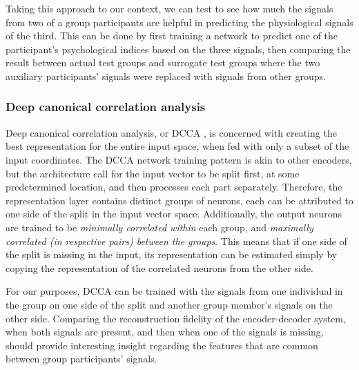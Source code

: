 \documentclass[a4paper, 11pt]{report}      %
\begin{document}
Taking this approach to our context, we can test to see how much the signals from two of a group participants are helpful in predicting the physiological signals of the third. This can be done by first training a network to predict one of the participant's psychological indices based on the three signals, then comparing the result between actual test groups and surrogate test groups where the two auxiliary participants' signals were replaced with signals from other groups.


\subsubsection{Deep canonical correlation analysis}
Deep canonical correlation analysis, or DCCA  \citep{andrew2013deep}, is concerned with creating the best representation for the entire input space, when fed with only a subset of the input coordinates. The DCCA network training pattern is akin to other encoders, but the architecture call for the input vector to be split first, at some predetermined location, and then processes each part separately. Therefore, the representation layer contains distinct groups of neurons, each can be attributed to one side of the split in the input vector space. Additionally, the output neurons are trained to be \emph{minimally correlated within} each group, and \emph{maximally correlated (in respective pairs) between the groups}. This means that if one side of the split is missing in the input, its representation can be estimated simply by copying the representation of the correlated neurons from the other side.

For our purposes, DCCA can be trained with the signals from one individual in the group on one side of the split and another group member's signals on the other side. Comparing the reconstruction fidelity of the encoder-decoder system, when both signals are present, and then when one of the signals is missing, should provide interesting insight regarding the features that are common between group participants' signals.




\end{document}

